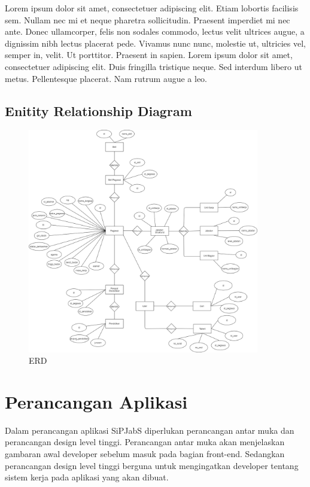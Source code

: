 Lorem ipsum dolor sit amet, consectetuer adipiscing elit. Etiam lobortis facilisis sem.  Nullam nec mi et neque pharetra sollicitudin.  Praesent imperdiet  mi nec ante. Donec ullamcorper, felis non sodales commodo, lectus velit ultrices augue, a dignissim nibh lectus placerat pede. Vivamus nunc nunc, molestie ut, ultricies vel, semper in, velit. Ut porttitor. Praesent in sapien. Lorem ipsum dolor sit amet, consectetuer adipiscing elit. Duis fringilla tristique neque. Sed interdum libero ut metus. Pellentesque placerat.  Nam rutrum augue a leo.  

\subsection{Enitity Relationship Diagram}

\begin{figure}
	\centering
	\includegraphics[width=0.9\textwidth]
	{pics/diagram/erd.png}
	\caption{ERD}
	\label{fig:32}
\end{figure}

\section{Perancangan Aplikasi}
Dalam perancangan aplikasi SiPJabS diperlukan perancangan antar muka dan perancangan design level tinggi. Perancangan antar muka akan menjelaskan gambaran awal  developer sebelum masuk pada bagian front-end.  Sedangkan perancangan design level tinggi berguna untuk mengingatkan developer tentang sistem kerja pada aplikasi yang akan dibuat.



